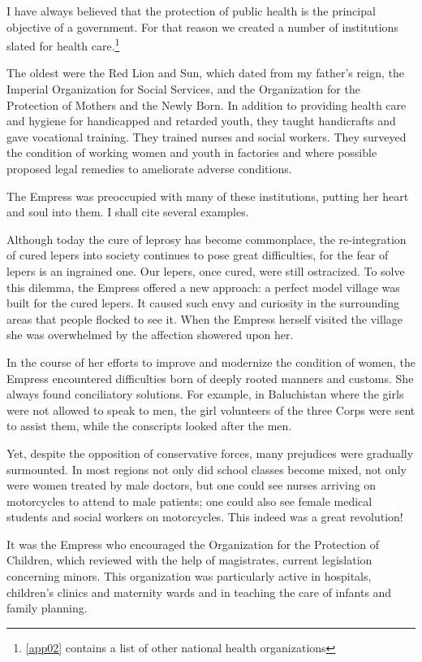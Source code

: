 I have always believed that the protection of public health is the principal objective of a government. For that reason we created a number of institutions slated for health care.\footnote{\cref{app02} contains a list of other national health organizations}

The oldest were the Red Lion and Sun, which dated from my father's reign, the Imperial Organization for Social Services, and the Organization for the Protection of Mothers and the Newly Born. In addition to providing health care and hygiene for handicapped and retarded youth, they taught handicrafts and gave vocational training. They trained nurses and social workers. They surveyed the condition of working women and youth in factories and where possible proposed legal remedies to ameliorate adverse conditions. 

The Empress was preoccupied with many of these institutions, putting her heart and soul into them. I shall cite several examples. 

Although today the cure of leprosy has become commonplace, the re-integration of cured lepers into society continues to pose great difficulties, for the fear of lepers is an ingrained one. Our lepers, once cured, were still ostracized. To solve this dilemma, the Empress offered a new approach: a perfect model village was built for the cured lepers. It caused such envy and curiosity in the surrounding areas that people flocked to see it. When the Empress herself visited the village she was overwhelmed by the affection showered upon her. 

In the course of her efforts to improve and modernize the condition of women, the Empress encountered difficulties born of deeply rooted manners and customs. She always found conciliatory solutions. For example, in Baluchistan where the girls were not allowed to speak to men, the girl volunteers of the three Corps were sent to assist them, while the conscripts looked after the men. 

Yet, despite the opposition of conservative forces, many prejudices were gradually surmounted. In most regions not only did school classes become mixed, not only were women treated by male doctors, but one could see nurses arriving on motorcycles to attend to male patients; one could also see female medical students and social workers on motorcycles. This indeed was a great revolution! 

It was the Empress who encouraged the Organization for the Protection of Children, which reviewed with the help of magistrates, current legislation concerning minors. This organization was particularly active in hospitals, children’s clinics and maternity wards and in teaching the care of infants and family planning. 

